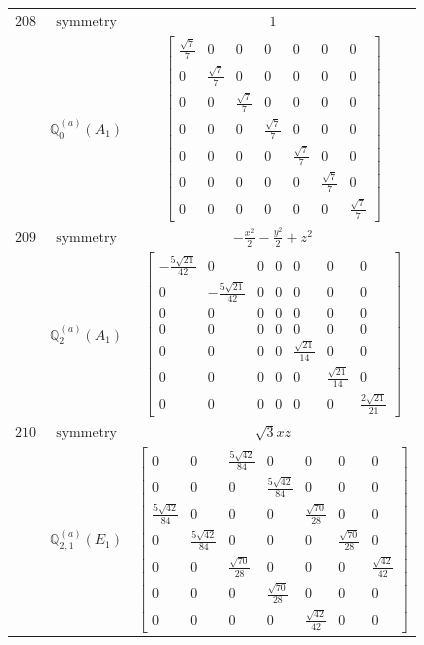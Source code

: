 \documentclass[fleqn,8pt,landscape]{jsarticle}
\begin{document}
\begin{longtable}{ccc}
$ 208 $ & $ \text{symmetry} $ & $ 1 $ \\
$  $ & $ \mathbb{Q}_{0}^{(a)}(A_{1}) $ & $ \begin{bmatrix} \frac{\sqrt{7}}{7} & 0 & 0 & 0 & 0 & 0 & 0 \\ 0 & \frac{\sqrt{7}}{7} & 0 & 0 & 0 & 0 & 0 \\ 0 & 0 & \frac{\sqrt{7}}{7} & 0 & 0 & 0 & 0 \\ 0 & 0 & 0 & \frac{\sqrt{7}}{7} & 0 & 0 & 0 \\ 0 & 0 & 0 & 0 & \frac{\sqrt{7}}{7} & 0 & 0 \\ 0 & 0 & 0 & 0 & 0 & \frac{\sqrt{7}}{7} & 0 \\ 0 & 0 & 0 & 0 & 0 & 0 & \frac{\sqrt{7}}{7} \end{bmatrix} $ \\ \hline
$ 209 $ & $ \text{symmetry} $ & $ - \frac{x^{2}}{2} - \frac{y^{2}}{2} + z^{2} $ \\
$  $ & $ \mathbb{Q}_{2}^{(a)}(A_{1}) $ & $ \begin{bmatrix} - \frac{5 \sqrt{21}}{42} & 0 & 0 & 0 & 0 & 0 & 0 \\ 0 & - \frac{5 \sqrt{21}}{42} & 0 & 0 & 0 & 0 & 0 \\ 0 & 0 & 0 & 0 & 0 & 0 & 0 \\ 0 & 0 & 0 & 0 & 0 & 0 & 0 \\ 0 & 0 & 0 & 0 & \frac{\sqrt{21}}{14} & 0 & 0 \\ 0 & 0 & 0 & 0 & 0 & \frac{\sqrt{21}}{14} & 0 \\ 0 & 0 & 0 & 0 & 0 & 0 & \frac{2 \sqrt{21}}{21} \end{bmatrix} $ \\ \hline
$ 210 $ & $ \text{symmetry} $ & $ \sqrt{3} x z $ \\
$  $ & $ \mathbb{Q}_{2,1}^{(a)}(E_{1}) $ & $ \begin{bmatrix} 0 & 0 & \frac{5 \sqrt{42}}{84} & 0 & 0 & 0 & 0 \\ 0 & 0 & 0 & \frac{5 \sqrt{42}}{84} & 0 & 0 & 0 \\ \frac{5 \sqrt{42}}{84} & 0 & 0 & 0 & \frac{\sqrt{70}}{28} & 0 & 0 \\ 0 & \frac{5 \sqrt{42}}{84} & 0 & 0 & 0 & \frac{\sqrt{70}}{28} & 0 \\ 0 & 0 & \frac{\sqrt{70}}{28} & 0 & 0 & 0 & \frac{\sqrt{42}}{42} \\ 0 & 0 & 0 & \frac{\sqrt{70}}{28} & 0 & 0 & 0 \\ 0 & 0 & 0 & 0 & \frac{\sqrt{42}}{42} & 0 & 0 \end{bmatrix} $ \\ \hline

\end{longtable}
\end{document}
